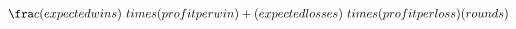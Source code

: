 \documentclass[preview]{standalone}
\begin{document}
\begin{align*}
\fra c {( e x p e c t e d   win s )   \ t im e s   ( p r o fi t   p e r   win)   +   ( e x p e c t e d   l o s s e s )   \ t im e s   ( p r o fi t   p e r   l o s s )}{(r o un d s )}
\end{align*}
\end{document}
